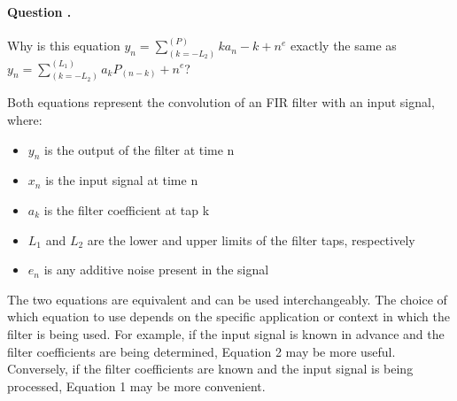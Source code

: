 \documentclass[14pt,a4paper]{report}
\newcounter{question}
\newcommand*\question{%
\stepcounter{question}%
\paragraph{Question \thesection.\thequestion}}
\begin{document}
\question
{
    Why is this equation $y_n = \sum_(k=-L_2)^(P) k a_n-k + n^e$ exactly the same as $y_n = \sum_(k=-L_2)^(L_1) a_k P_(n-k) + n^e$?
}
\begin{answer_box*}
    Both equations represent the convolution of an FIR filter with an input signal, where:

\begin{itemize}
        \item $y_n$ is the output of the filter at time n
        \item $x_n$ is the input signal at time n
        \item $a_k$ is the filter coefficient at tap k
        \item $L_1$ and $L_2$ are the lower and upper limits of the filter taps, respectively
        \item $e_n$ is any additive noise present in the signal
\end{itemize}

The two equations are equivalent and can be used interchangeably. The choice of which equation to use depends on the specific application or context in which the filter is being used. For example, if the input signal is known in advance and the filter coefficients are being determined, Equation 2 may be more useful. Conversely, if the filter coefficients are known and the input signal is being processed, Equation 1 may be more convenient.
\end{answer_box*}
\end{document}
